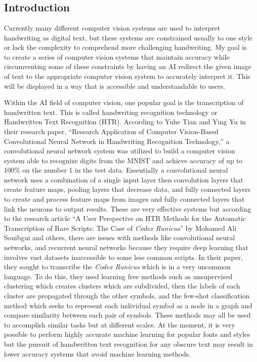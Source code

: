 \documentclass[12pt]{article}
\begin{document}
 
\begin{flushleft} 
 \\ 
 \\ 
 \\ 
\end{flushleft} 
\begin{center}
\section*{Introduction}
\end{center}
\indent{} Currently many different computer vision systems are used to interpret handwriting as digital text, but these systems are constrained usually to one style or lack the complexity to comprehend more challenging handwriting. My goal is to create a series of computer vision systems that maintain accuracy while circumventing some of these constraints by having an AI redirect the given image of text to the appropriate computer vision system to accurately interpret it. This will be displayed in a way that is accessible and understandable to users.

Within the AI field of computer vision, one popular goal is the transcription of handwritten text. This is called handwriting recognition technology or Handwritten Text Recognition (HTR). According to Yuhe Tian and Ying Yu in their research paper, “Research Application of Computer Vision-Based Convolutional Neural Network in Handwriting Recognition Technology,” a convolutional neural network system was utilized to build a computer vision system able to recognize digits from the MNIST and achieve accuracy of up to 100\% on the number 1 in the test data. Essentially a convolutional neural network uses a combination of a single input layer then convolution layers that create feature maps, pooling layers that decrease data, and fully connected layers to create and process feature maps from images and fully connected layers that link the neurons to output results. These are very effective systems but according to the research article “A User Perspective on HTR Methods for the Automatic Transcription of Rare Scripts: The Case of \emph{Codex Runicus}” by Mohamed Ali Souibgui and others, there are issues with methods like convolutional neural networks, and recurrent neural networks because they require deep learning that involves vast datasets inaccessible to some less common scripts. In their paper, they sought to transcribe the \emph{Codex Runicus} which is in a very uncommon language. To do this, they used learning free methods such as unsupervised clustering which creates clusters which are subdivided, then the labels of each cluster are propagated through the other symbols, and the few-shot classification method which seeks to represent each individual symbol as a node in a graph and compare similarity between each pair of symbols. These methods may all be used to accomplish similar tasks but at different scales. At the moment, it is very possible to perform highly accurate machine learning for popular fonts and styles but the pursuit of handwritten text recognition for any obscure text may result in lower accuracy systems that avoid machine learning methods.
\end{document}
